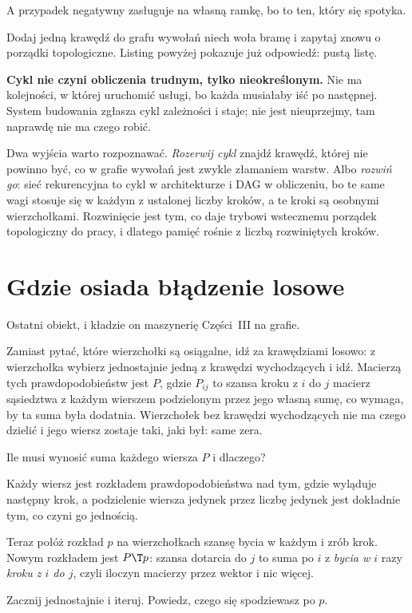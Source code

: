 \begin{fr}
A przypadek negatywny zasługuje na własną ramkę, bo to ten, który się spotyka.

Dodaj jedną krawędź do grafu wywołań \dash{} niech  woła bramę
\dash{} i zapytaj znowu o porządki topologiczne. Listing powyżej pokazuje już
odpowiedź: pustą listę.

\begin{trapbox}
\textbf{Cykl nie czyni obliczenia trudnym, tylko nieokreślonym.} Nie ma
kolejności, w której uruchomić usługi, bo każda musiałaby iść po następnej.
System budowania zgłasza cykl zależności i staje; nie jest nieuprzejmy, tam
naprawdę nie ma czego robić.

Dwa wyjścia warto rozpoznawać. \emph{Rozerwij cykl} \dash{} znajdź krawędź,
której nie powinno być, co w grafie wywołań jest zwykle złamaniem warstw. Albo
\emph{rozwiń go}: sieć rekurencyjna to cykl w architekturze i DAG w obliczeniu,
bo te same wagi stosuje się w każdym z ustalonej liczby kroków, a te kroki są
osobnymi wierzchołkami. Rozwinięcie jest tym, co daje trybowi wstecznemu
porządek topologiczny do pracy, i dlatego pamięć rośnie z liczbą
rozwiniętych kroków.
\end{trapbox}
\end{fr}

\section{Gdzie osiada błądzenie losowe}
\label{sec:P13-walks-random}

\begin{fr}
Ostatni obiekt, i kładzie on maszynerię Części~III na grafie.

Zamiast pytać, które wierzchołki są osiągalne, idź za krawędziami losowo: z
wierzchołka wybierz jednostajnie jedną z krawędzi wychodzących i idź. Macierzą
tych prawdopodobieństw jest $P$, gdzie $P_{ij}$ to szansa kroku z $i$ do $j$
\dash{} macierz sąsiedztwa z każdym wierszem podzielonym przez jego własną
sumę, co wymaga, by ta suma była dodatnia. Wierzchołek bez krawędzi
wychodzących nie ma czego dzielić i jego wiersz zostaje taki, jaki był: same
zera.

Ile musi wynosić suma każdego wiersza $P$ i dlaczego?
\dotline
\nextframe
\end{fr}

\begin{fr}
Każdy wiersz jest rozkładem prawdopodobieństwa nad tym, gdzie wyląduje
następny krok, a podzielenie wiersza jedynek przez liczbę jedynek jest
dokładnie tym, co czyni go jednością.

Teraz połóż rozkład $p$ na wierzchołkach \dash{} szansę bycia w każdym \dash{}
i zrób krok. Nowym rozkładem jest $P\T p$: szansa dotarcia do $j$ to suma po
$i$ z \emph{bycia w $i$} razy \emph{kroku z $i$ do $j$}, czyli iloczyn
macierzy przez wektor i nic więcej.

Zacznij jednostajnie i iteruj. Powiedz, czego się spodziewasz po $p$.
\nextframe
\end{fr}

